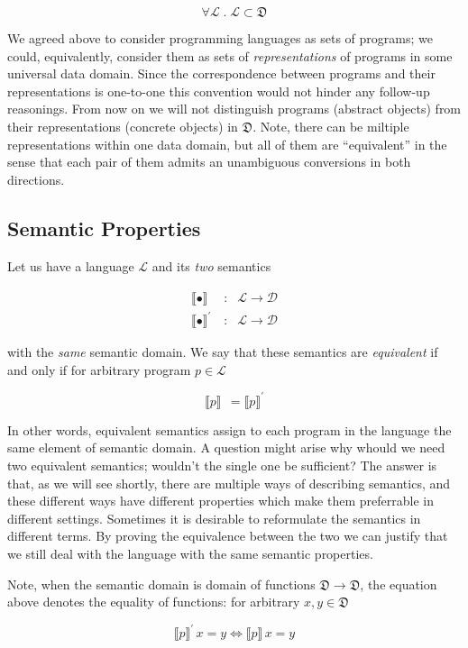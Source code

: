 \documentclass{article}
\newcommand{\sembr}[1]{\llbracket{#1}\rrbracket}
\newcommand{\ph}{{\phantom{x}}}
\begin{document}
\[
\forall \mathcal{L}\; .\; \mathcal{L}\subset\mathfrak{D}
\]

We agreed above to consider programming languages as sets of programs; we could, equivalently, consider them as sets of \emph{representations} of
programs in some universal data domain. Since the correspondence between programs and their representations is one-to-one this convention would
not hinder any follow-up reasonings. From now on we will not distinguish programs (abstract objects) from their representations (concrete objects)
in $\mathfrak{D}$. Note, there can be miltiple representations within one data domain, but all of them are ``equivalent'' in the sense that
each pair of them admits an unambiguous conversions in both directions.

\subsection{Semantic Properties}

Let us have a language $\mathcal{L}$ and its \emph{two} semantics

\[
\begin{array}{rcl}
    \sembr{\bullet}^\ph & : & \mathcal{L} \to \mathcal{D}\\
  \sembr{\bullet}^\prime & : & \mathcal{L} \to \mathcal{D}
\end{array}
\]

with the \emph{same} semantic domain. We say that these semantics are \emph{equivalent} if and only if for arbitrary program $p\in\mathcal{L}$

\[
\sembr{p}^\ph=\sembr{p}^\prime
\]

In other words, equivalent semantics assign to each program in the language the same element of semantic domain. A question might arise why whould we
need two equivalent semantics; wouldn't the single one be sufficient? The answer is that, as we will see shortly, there are multiple ways of
describing semantics, and these different ways have different properties which make them preferrable in different settings. Sometimes it is desirable to
reformulate the semantics in different terms. By proving the equivalence between the two we can justify that we still deal with the language with the same
semantic properties.

Note, when the semantic domain is domain of functions $\mathfrak{D}\to\mathfrak{D}$, the equation above denotes the equality of functions: for
arbitrary $x, y\in\mathfrak{D}$

\[
\sembr{p}^\prime\,x=y \Leftrightarrow \sembr{p}\,x=y
\]
\end{document}

